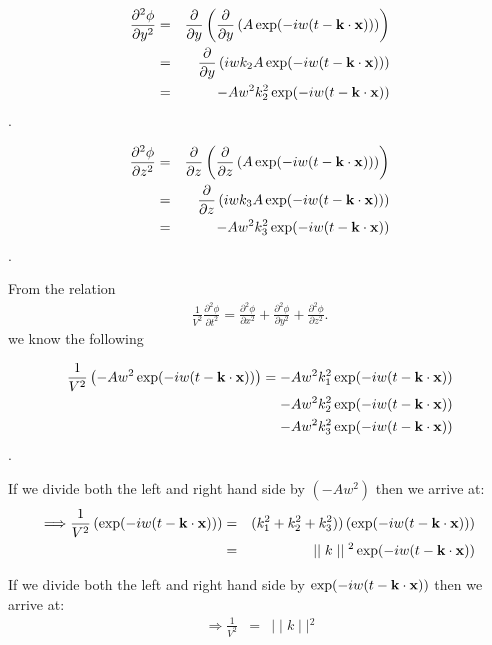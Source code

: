 \documentclass{mm2}
\begin{document}
\begin{answer}{1}
\begin{eqnarray}
\frac{\partial^2\phi}{\partial y^2}&=&\frac{\partial}{\partial y} \left(  \frac{\partial}{\partial y}  \left(  A\exp(-iw(t - {\bf k}\cdot {\bf x} ))  \right) \right)\\ &=&  \frac{\partial}{\partial y} \left( iwk_2A \exp(-iw(t - {\bf k}\cdot {\bf x} ))\right)\\ &=& -Aw^2k_2^2 \exp(-iw(t - {\bf k}\cdot {\bf x}))\\
\end{eqnarray}.

\begin{eqnarray}
\frac{\partial^2\phi}{\partial z^2}&=&\frac{\partial}{\partial z} \left(  \frac{\partial}{\partial z}  \left(  A\exp(-iw(t - {\bf k}\cdot {\bf x}))  \right) \right)\\ &=&  \frac{\partial}{\partial z} \left( iwk_3A \exp(-iw(t - {\bf k}\cdot {\bf x} ))\right)\\ &=& -Aw^2k_3^2 \exp(-iw(t - {\bf k}\cdot {\bf x} ))\\
\end{eqnarray}.
\end{answer}

From the relation \begin{eqnarray}
\frac{1}{V^2}\frac{\partial^2 \phi}{\partial t^2}=\frac{\partial^2 \phi}{\partial x^2}+\frac{\partial^2 \phi}{\partial y^2}+
\frac{\partial^2 \phi}{\partial z^2}.
\label{eq_wave}
\end{eqnarray} we know the following

\begin{eqnarray}
\frac{1}{V^2}\left(-Aw^2 \exp(-iw(t - {\bf k}\cdot {\bf x} ))\right) = -Aw^2k_1^2 \exp(-iw(t - {\bf k}\cdot {\bf x} ))\\ -Aw^2k_2^2 \exp(-iw(t - {\bf k}\cdot {\bf x}))\\ -Aw^2k_3^2 \exp(-iw(t - {\bf k}\cdot {\bf x} ))
\end{eqnarray}.

If we divide both the left and right hand side by $(-Aw^2)$ then we arrive at:
\begin{eqnarray}
\Longrightarrow \frac{1}{V^2}\left(\exp(-iw(t - {\bf k}\cdot {\bf x} ))\right) &=& (k_1^2 + k_2^2 + k_3^2))\left(\exp(-iw(t - {\bf k}\cdot {\bf x} ))\right)\\ &=& \mid \mid k \mid \mid {^2} \exp(-iw(t - {\bf k}\cdot {\bf x}))
\end{eqnarray}

If we divide both the left and right hand side by $\exp(-iw(t - {\bf k}\cdot {\bf x} ))$ then we arrive at:
\begin{eqnarray}
\Longrightarrow \frac{1}{V^2} &=& \mid \mid k \mid \mid {^2}
\end{eqnarray}
\end{document}
